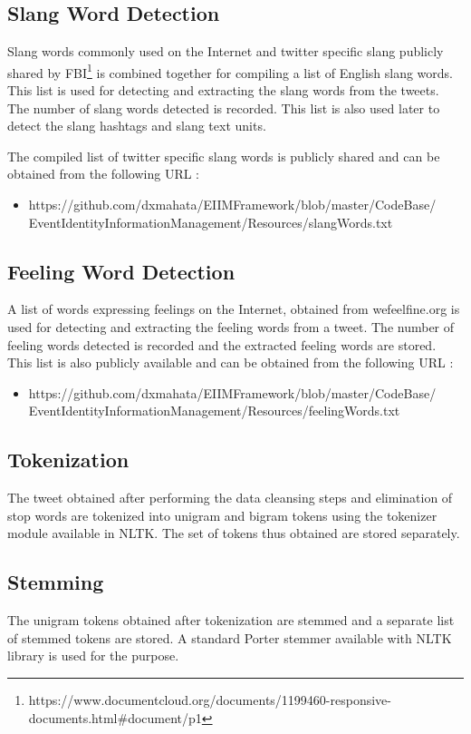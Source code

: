 \subsection{Slang Word Detection}
Slang words commonly used on the Internet and twitter specific slang publicly shared by FBI\footnote{https://www.documentcloud.org/documents/1199460-responsive-documents.html\#document/p1} is combined together for compiling a list of English slang words. This list is used for detecting and extracting the slang words from the tweets. The number of slang words detected is recorded. This list is also used later to detect the slang hashtags and slang text units.

The compiled list of twitter specific slang words is publicly shared and can be obtained from the following URL : 
\begin{itemize}
\item https://github.com/dxmahata/EIIMFramework/blob/master/CodeBase/\\EventIdentityInformationManagement/Resources/slangWords.txt
\end{itemize}

\subsection{Feeling Word Detection} 
A list of words expressing feelings on the Internet, obtained from wefeelfine.org is used for detecting and extracting the feeling words from a tweet. The number of feeling words detected is recorded and the extracted feeling words are stored. This list is also publicly available and can be obtained from the following URL :
\begin{itemize}
\item https://github.com/dxmahata/EIIMFramework/blob/master/CodeBase/\\EventIdentityInformationManagement/Resources/feelingWords.txt
\end{itemize}

\subsection{Tokenization}
The tweet obtained after performing the data cleansing steps and elimination of stop words are tokenized into unigram and bigram tokens using the tokenizer module available in NLTK. The set of tokens thus obtained are stored separately.

\subsection{Stemming}
The unigram tokens obtained after tokenization are stemmed and a separate list of stemmed tokens are stored. A standard Porter stemmer available with NLTK library is used for the purpose.


